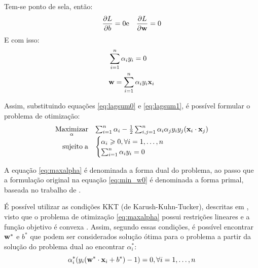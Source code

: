 
Tem-se ponto de sela, então:
\begin{eqnarray}\label{eq:sela}
  \frac{\partial{L}}{\partial{b}} = 0 & \text{e} & \frac{\partial{L}}{\partial{\mathbf{w}}} = 0
\end{eqnarray}
E com isso:
\begin{eqnarray}
&  \label{eq:lagsum0}  \sum_{i=1}^n{\alpha_i y_i} = 0 \\
&  \label{eq:lagsum1}  \mathbf{w} = \sum_{i=1}^n{\alpha_i y_i\mathbf{x}_i}
\end{eqnarray}

Assim, substituindo equações \ref{eq:lagsum0} e \ref{eq:lagsum1}, é possível formular o problema de otimização:
\begin{eqnarray}\label{eq:maxalpha}
\begin{array}{rl}
   \underset{\alpha}{\operatorname{Maximizar}}
   & \sum_{i=1}^n{\alpha_i - \frac{1}{2}}
                            \sum_{i,j=1}^n{\alpha_i\alpha_j y_i y_j(\mathbf{x}_i\cdot\mathbf{x}_j)} \\
\operatorname{sujeito\;a} &
  \begin{cases}
    \alpha_i \geqslant 0, \forall{i} = 1,\dotsc,n \\
    \sum_{i=1}^n{\alpha_i y_i} = 0
  \end{cases}
\end{array}
\end{eqnarray}

A equação \ref{eq:maxalpha} é denominada a forma dual do problema, ao passo que a formulação original na equação \ref{eq:min_w0} é denominada a forma primal, baseada no trabalho de .


É possível utilizar as condições KKT (de Karush-Kuhn-Tucker), descritas em , visto que o problema de otimização \ref{eq:maxalpha} possui restrições lineares e a função objetivo é convexa \cite{burges1998tutorial}. Assim, segundo essas condições, é possível encontrar $\mathbf{w^*}$ e $b^*$ que podem ser considerados solução ótima para o problema a partir da solução do problema dual ao encontrar $\alpha_i^*$:
\begin{equation}\label{eq:dualalpha}
  \alpha_i^*(y_i(\mathbf{w^*}\cdot\mathbf{x}_i+b^*) - 1) = 0, \forall{i}=1,\dotsc,n
\end{equation}

